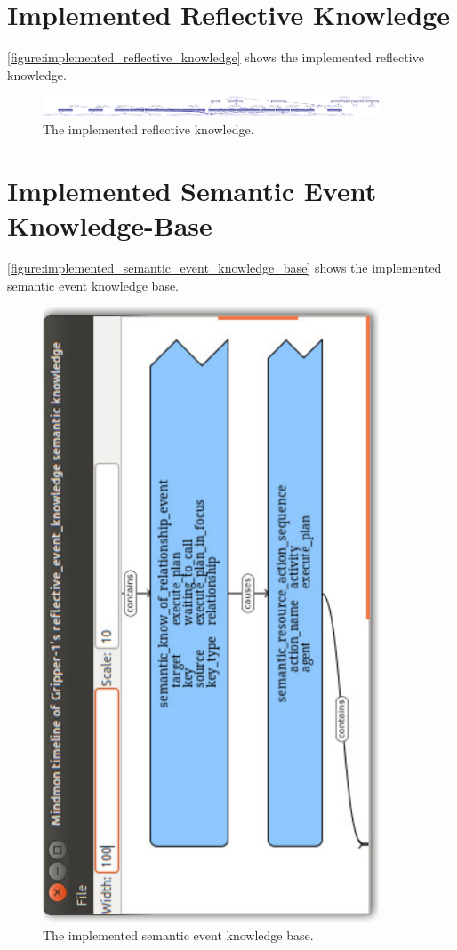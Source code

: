 \section{Implemented Reflective Knowledge}

{\mbox{\autoref{figure:implemented_reflective_knowledge}}} shows the
implemented reflective knowledge.
\begin{figure}
\includegraphics[width=10cm]{gfx/implemented_reflective_knowledge}
\caption[The implemented reflective knowledge.]{The implemented
  reflective knowledge.}
\label{figure:implemented_reflective_knowledge}
\end{figure}

\section{Implemented Semantic Event Knowledge-Base}

{\mbox{\autoref{figure:implemented_semantic_event_knowledge_base}}} shows the
implemented semantic event knowledge base.
\begin{figure}
\includegraphics[width=10cm]{gfx/implemented_semantic_event_knowledge_base}
\caption[The implemented semantic event knowledge base.]{The
  implemented semantic event knowledge base.}
\label{figure:implemented_semantic_event_knowledge_base}
\end{figure}

